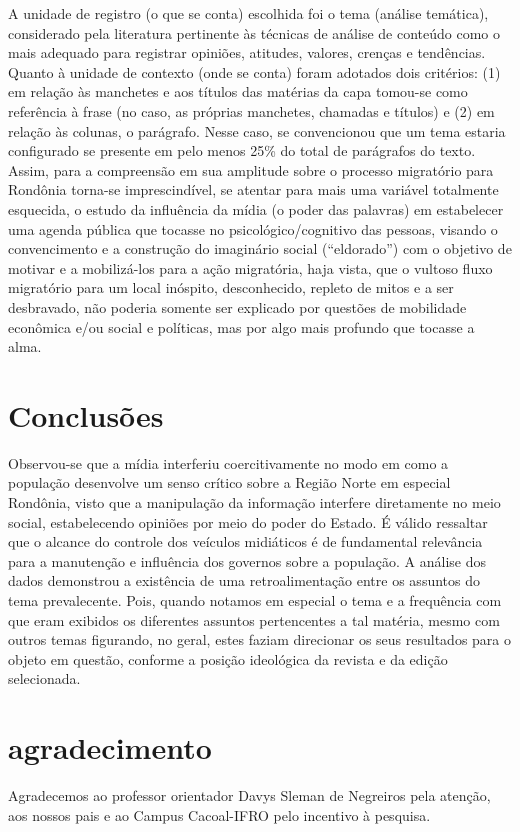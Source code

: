 \documentclass[article,12pt,onesidea,4paper,english,brazil]{abntex2}
\begin{document}
A unidade de registro (o que se conta) escolhida foi o tema (análise temática), considerado pela literatura pertinente às técnicas de análise de conteúdo como o mais adequado para registrar opiniões, atitudes, valores, crenças e tendências.
Quanto à unidade de contexto (onde se conta) foram adotados dois critérios: (1) em relação às manchetes e aos títulos das matérias da capa tomou-se como referência à frase (no caso, as próprias manchetes, chamadas e títulos) e (2) em relação às colunas, o parágrafo. Nesse caso, se convencionou que um tema estaria configurado se presente em pelo menos 25\% do total de parágrafos do texto. Assim, para a compreensão em sua amplitude sobre o processo migratório para Rondônia torna-se imprescindível, se atentar para mais uma variável totalmente esquecida, o estudo da influência da mídia (o poder das palavras) em estabelecer uma agenda pública que tocasse no psicológico/cognitivo das pessoas, visando o convencimento e a construção do imaginário social (“eldorado”) com o objetivo de motivar e a mobilizá-los para a ação migratória, haja vista, que o vultoso fluxo migratório para um local inóspito, desconhecido, repleto de mitos e a ser desbravado, não poderia somente ser explicado por questões de mobilidade econômica e/ou social e  políticas, mas por algo mais profundo que tocasse a alma.

	
	\section*{Conclusões}
	
Observou-se que a mídia interferiu coercitivamente no modo em como a população desenvolve um senso crítico sobre a Região Norte em especial Rondônia, visto que a manipulação da informação interfere diretamente no meio social, estabelecendo opiniões por meio do poder do Estado. É válido ressaltar que o alcance do controle dos veículos midiáticos é de fundamental relevância para a manutenção e influência dos governos sobre a população. A análise dos dados demonstrou a existência de uma retroalimentação entre os assuntos do tema prevalecente. Pois, quando notamos em especial o tema e a frequência com que eram exibidos os diferentes assuntos pertencentes a tal matéria, mesmo com outros temas figurando, no geral, estes faziam direcionar os seus resultados para o objeto em questão, conforme a posição ideológica da revista e da edição selecionada.

	\section*{agradecimento}
	Agradecemos ao professor orientador Davys Sleman de Negreiros pela atenção, aos nossos pais e ao Campus Cacoal-IFRO pelo incentivo à pesquisa.
	
\end{document}
